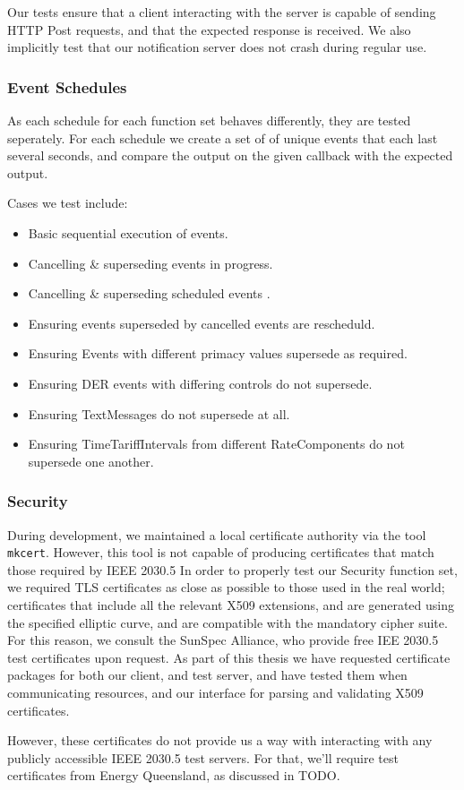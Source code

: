 Our tests ensure that a client interacting with the server is capable of sending HTTP Post requests, and that the expected response is received. We also implicitly test that our notification server does not crash during regular use.

\subsubsection{Event Schedules}
As each schedule for each function set behaves differently, they are tested seperately. For each schedule we create a set of of unique events that each last several seconds, and compare the output on the given callback with the expected output. 

Cases we test include:

\begin{itemize}
    \item Basic sequential execution of events.
    \item Cancelling \& superseding events in progress.
    \item Cancelling \& superseding scheduled events .
    \item Ensuring events superseded by cancelled events are rescheduld.
    \item Ensuring Events with different primacy values supersede as required.
    \item Ensuring DER events with differing controls do not supersede.
    \item Ensuring TextMessages do not supersede at all.
    \item Ensuring TimeTariffIntervals from different RateComponents do not supersede one another.
\end{itemize}

\subsubsection{Security}
During development, we maintained a local certificate authority via the tool \texttt{mkcert}. However, this tool is not capable of producing certificates that match those required by IEEE 2030.5
In order to properly test our Security function set, we required TLS certificates as close as possible to those used in the real world; certificates that include all the relevant X509 extensions, and are generated using the specified elliptic curve, and are compatible with the mandatory cipher suite. For this reason, we consult the SunSpec Alliance, who provide free IEE 2030.5 test certificates upon request. As part of this thesis we have requested certificate packages for both our client, and test server, and have tested them when communicating resources, and our interface for parsing and validating X509 certificates.

However, these certificates do not provide us a way with interacting with any publicly accessible IEEE 2030.5 test servers. For that, we'll require test certificates from Energy Queensland, as discussed in TODO.










